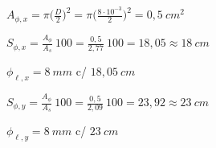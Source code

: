 \begin{resposta}
\begin{enumerate}[start=8]
\begin{enumerate}
            $A_{\phi,x} = \pi\Big(\frac{D}{2}\Big)^2 = \pi \Big(\frac{8\cdot 10^{-3}}{2}\Big)^2 = 0,5 \ cm^2$ 
            
            $S_{\phi,x} = \frac{A_{\phi}}{A_s}\ 100 = \frac{0,5}{2,77} \ 100 = 18,05 \approx 18 \ cm$

            $\phi_{\ell,x} = 8 \ mm$ c/ $18,05 \ cm$ \newline

            
            $S_{\phi,y} = \frac{A_{\phi}}{A_s}\ 100 = \frac{0,5}{2,09} \ 100 = 23,92 \approx 23 \ cm$ 

            $\phi_{\ell,y} = 8 \ mm$ c/ $23 \ cm$\newline
        \end{enumerate}
        
    \end{enumerate}
\end{resposta}